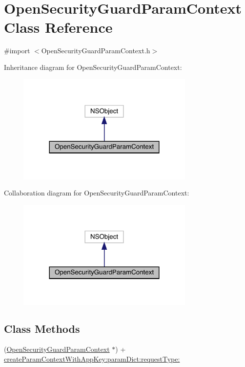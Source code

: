 \hypertarget{interface_open_security_guard_param_context}{}\section{Open\+Security\+Guard\+Param\+Context Class Reference}
\label{interface_open_security_guard_param_context}


{\ttfamily \#import $<$Open\+Security\+Guard\+Param\+Context.\+h$>$}



Inheritance diagram for Open\+Security\+Guard\+Param\+Context\+:\nopagebreak
\begin{figure}[H]
\begin{center}
\leavevmode
\includegraphics[width=248pt]{interface_open_security_guard_param_context__inherit__graph}
\end{center}
\end{figure}


Collaboration diagram for Open\+Security\+Guard\+Param\+Context\+:\nopagebreak
\begin{figure}[H]
\begin{center}
\leavevmode
\includegraphics[width=248pt]{interface_open_security_guard_param_context__coll__graph}
\end{center}
\end{figure}
\subsection*{Class Methods}
\begin{DoxyCompactItemize}
\item 
(\mbox{\hyperlink{interface_open_security_guard_param_context}{Open\+Security\+Guard\+Param\+Context}} $\ast$) + \mbox{\hyperlink{interface_open_security_guard_param_context_ada3860c989e82a3a6dd9ad72296f3a61}{create\+Param\+Context\+With\+App\+Key\+:param\+Dict\+:request\+Type\+:}}
\end{DoxyCompactItemize}

